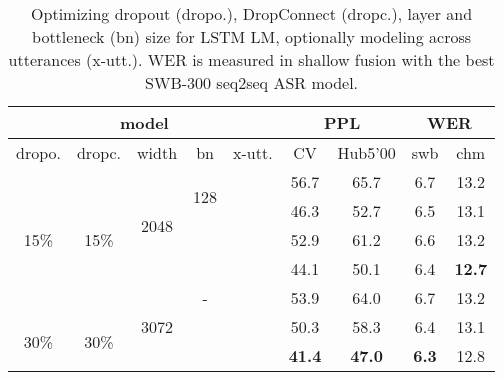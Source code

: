 \documentclass[a4paper]{article}
\begin{document}
\begin{table}
  \centering
  \caption{Optimizing dropout (dropo.), DropConnect (dropc.), layer and bottleneck (bn) size for LSTM LM, optionally modeling across utterances (x-utt.). WER is measured in shallow fusion with the best SWB-300 seq2seq ASR model.}
\vspace{-3mm}
  \begin{tabular}{|@{}c@{}|@{}c@{}|@{}c@{}|@{}c@{}|@{}c@{}|@{}c@{}|@{}c@{}|@{}c@{}|@{}c@{}|}
\hline
 \multicolumn{5}{|c|}{model}               & \multicolumn{2}{c|}{PPL} & \multicolumn{2}{c|}{WER} \\
\hline
 \hspace{1mm}dropo.\hspace{1mm} & \hspace{1mm}dropc.\hspace{1mm} & \hspace{1mm}width\hspace{1mm}  & \hspace{1.5mm}bn\hspace{1.5mm}  &  x-utt. & \hspace{1.5mm}CV\hspace{1.5mm}   & \hspace{1mm}Hub5'00\hspace{1mm} & \hspace{1mm}swb\hspace{1mm} & \hspace{1mm}chm\hspace{1mm}  \\
\hline
\multirow{5}{*}{15\%} & \multirow{5}{*}{15\%} & \multirow{4}{*}{2048}  & \multirow{2}{*}{128} &          & 56.7 & 65.7 & 6.7 & 13.2 \\ \cline{5-9}
          &            &        &     &  & 46.3 & 52.7 & 6.5 & 13.1 \\ \cline{4-9}
          &            &        & \multirow{5}{*}{-}  &          & 52.9 & 61.2 & 6.6 & 13.2  \\  \cline{5-9}
          &            &        &     &  & 44.1 &  50.1 & 6.4 & {\bf 12.7} \\ \cline{3-3}\cline{5-9}
          &            & \multirow{3}{*}{3072} &     &          & 53.9 & 64.0 &  6.7   & 13.2     \\ \cline{1-2}\cline{6-9}
 \multirow{2}{*}{30\%} & \multirow{2}{*}{30\%} &  &   &          & 50.3 & 58.3 &  6.4   & 13.1     \\ \cline{5-9}
                       &                       &  &   &  & {\bf 41.4} & {\bf 47.0}  & {\bf 6.3} & 12.8 \\
\hline
\end{tabular}
\label{tab:lmopt}
\vspace{-3mm}
\end{table}
\end{document}
